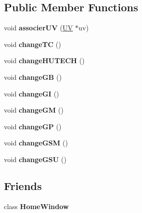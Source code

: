 \subsection*{Public Member Functions}
\begin{DoxyCompactItemize}
\item 
\hypertarget{class_u_v_window_af473ab82c2310d5bf149bfa4ad795a5d}{void {\bfseries associer\-U\-V} (\hyperlink{class_u_v}{U\-V} $\ast$uv)}\label{class_u_v_window_af473ab82c2310d5bf149bfa4ad795a5d}

\item 
\hypertarget{class_u_v_window_a9ab0b242d5e666cb3bd5ce0aa0905e45}{void {\bfseries change\-T\-C} ()}\label{class_u_v_window_a9ab0b242d5e666cb3bd5ce0aa0905e45}

\item 
\hypertarget{class_u_v_window_a852bccb255fd5caf4ab26621435bcb0a}{void {\bfseries change\-H\-U\-T\-E\-C\-H} ()}\label{class_u_v_window_a852bccb255fd5caf4ab26621435bcb0a}

\item 
\hypertarget{class_u_v_window_ae91dde11f6ce5be07effc2e1f9f7b29e}{void {\bfseries change\-G\-B} ()}\label{class_u_v_window_ae91dde11f6ce5be07effc2e1f9f7b29e}

\item 
\hypertarget{class_u_v_window_a8bf1a182d841943322da78812dc802d5}{void {\bfseries change\-G\-I} ()}\label{class_u_v_window_a8bf1a182d841943322da78812dc802d5}

\item 
\hypertarget{class_u_v_window_a7eac2a6f7ae1b4e2c70b14be0c091b32}{void {\bfseries change\-G\-M} ()}\label{class_u_v_window_a7eac2a6f7ae1b4e2c70b14be0c091b32}

\item 
\hypertarget{class_u_v_window_ae6e564de6bd7b63e3a138f2a4a246466}{void {\bfseries change\-G\-P} ()}\label{class_u_v_window_ae6e564de6bd7b63e3a138f2a4a246466}

\item 
\hypertarget{class_u_v_window_a481ec8ffb35143328075ffd4612e5215}{void {\bfseries change\-G\-S\-M} ()}\label{class_u_v_window_a481ec8ffb35143328075ffd4612e5215}

\item 
\hypertarget{class_u_v_window_aedd3b862188eb04bf4caed25284eae4b}{void {\bfseries change\-G\-S\-U} ()}\label{class_u_v_window_aedd3b862188eb04bf4caed25284eae4b}

\end{DoxyCompactItemize}
\subsection*{Friends}
\begin{DoxyCompactItemize}
\item 
\hypertarget{class_u_v_window_a89f0e38a39f054c26a0ab852f8a79b18}{class {\bfseries Home\-Window}}\label{class_u_v_window_a89f0e38a39f054c26a0ab852f8a79b18}

\end{DoxyCompactItemize}


